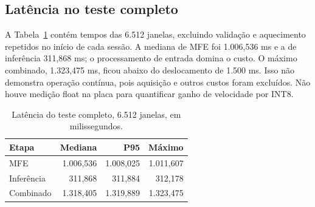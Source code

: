 \documentclass[9pt,twocolumn,twoside,lineno]{MSBJournal}
\begin{document}
\subsection{Latência no teste completo}
A Tabela~\ref{tab:timing} contém tempos das 6.512 janelas, excluindo validação e aquecimento repetidos no início de cada sessão. A mediana de MFE foi 1.006,536 ms e a de inferência 311,868 ms; o processamento de entrada domina o custo. O máximo combinado, 1.323,475 ms, ficou abaixo do deslocamento de 1.500 ms. Isso não demonstra operação contínua, pois aquisição e outros custos foram excluídos. Não houve medição float na placa para quantificar ganho de velocidade por INT8.
\begin{table}[t]\centering\setlength{\tabcolsep}{4pt}
\caption{Latência do teste completo, 6.512 janelas, em milissegundos.}\label{tab:timing}
\begin{tabular}{lrrr}\toprule
Etapa & Mediana & P95 & Máximo\\\midrule
MFE & 1.006,536 & 1.008,025 & 1.011,607\\
Inferência & 311,868 & 311,884 & 312,178\\
Combinado & 1.318,405 & 1.319,889 & 1.323,475\\\bottomrule
\end{tabular}\end{table}
\end{document}
